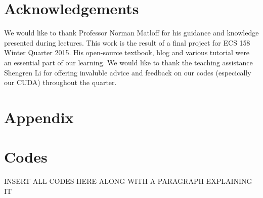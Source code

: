 \documentclass[11pt,letterpaper]{article}
\begin{document}
\section{Acknowledgements}
We would like to thank Professor Norman Matloff for his guidance and knowledge presented during lectures. This work is the result of a final project for ECS 158 Winter Quarter 2015.  His open-source textbook, blog and various tutorial were an essential part of our learning. We would like to thank the teaching assistance Shengren Li for offering invaluble advice and feedback on our codes (especically our CUDA) throughout the quarter.

\section{Appendix}

\appendix
\section{Codes} \label{App:AppendixA}

INSERT ALL CODES HERE ALONG WITH A PARAGRAPH EXPLAINING IT
\end{document}
